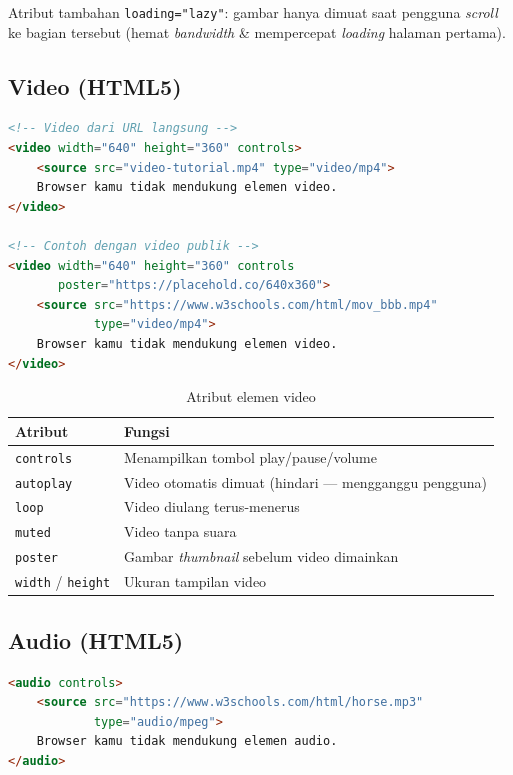 Atribut tambahan \texttt{loading="lazy"}: gambar hanya dimuat saat pengguna \emph{scroll} ke bagian tersebut (hemat \emph{bandwidth} \& mempercepat \emph{loading} halaman pertama).

\subsection{Video (HTML5)}

\begin{lstlisting}[language=HTML, caption={Menyisipkan video HTML5}, label={lst:m04-video}]
<!-- Video dari URL langsung -->
<video width="640" height="360" controls>
    <source src="video-tutorial.mp4" type="video/mp4">
    Browser kamu tidak mendukung elemen video.
</video>

<!-- Contoh dengan video publik -->
<video width="640" height="360" controls
       poster="https://placehold.co/640x360">
    <source src="https://www.w3schools.com/html/mov_bbb.mp4"
            type="video/mp4">
    Browser kamu tidak mendukung elemen video.
</video>
\end{lstlisting}

\begin{table}[ht]
\centering
\caption{Atribut elemen video}
\label{tab:m04-video}
\begin{tabular}{lp{8cm}}
\toprule
\textbf{Atribut} & \textbf{Fungsi} \\
\midrule
\texttt{controls} & Menampilkan tombol play/pause/volume \\
\texttt{autoplay} & Video otomatis dimuat (hindari --- mengganggu pengguna) \\
\texttt{loop} & Video diulang terus-menerus \\
\texttt{muted} & Video tanpa suara \\
\texttt{poster} & Gambar \emph{thumbnail} sebelum video dimainkan \\
\texttt{width} / \texttt{height} & Ukuran tampilan video \\
\bottomrule
\end{tabular}
\end{table}

\subsection{Audio (HTML5)}

\begin{lstlisting}[language=HTML, caption={Menyisipkan elemen audio}, label={lst:m04-audio}]
<audio controls>
    <source src="https://www.w3schools.com/html/horse.mp3"
            type="audio/mpeg">
    Browser kamu tidak mendukung elemen audio.
</audio>
\end{lstlisting}

